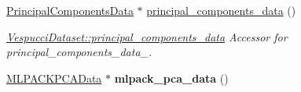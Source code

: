 \begin{DoxyCompactItemize}
\item 
\hyperlink{class_principal_components_data}{Principal\+Components\+Data} $\ast$ \hyperlink{class_vespucci_dataset_aaebb151c72e7f41b8d5e6b1067fd2a07}{principal\+\_\+components\+\_\+data} ()
\begin{DoxyCompactList}\small\item\em \hyperlink{class_vespucci_dataset_aaebb151c72e7f41b8d5e6b1067fd2a07}{Vespucci\+Dataset\+::principal\+\_\+components\+\_\+data} Accessor for principal\+\_\+components\+\_\+data\+\_\+. \end{DoxyCompactList}\item 
\hypertarget{class_vespucci_dataset_aa70df98d12e5ff1452672f270c996223}{\hyperlink{class_m_l_p_a_c_k_p_c_a_data}{M\+L\+P\+A\+C\+K\+P\+C\+A\+Data} $\ast$ {\bfseries mlpack\+\_\+pca\+\_\+data} ()}\label{class_vespucci_dataset_aa70df98d12e5ff1452672f270c996223}


\end{DoxyCompactItemize}
